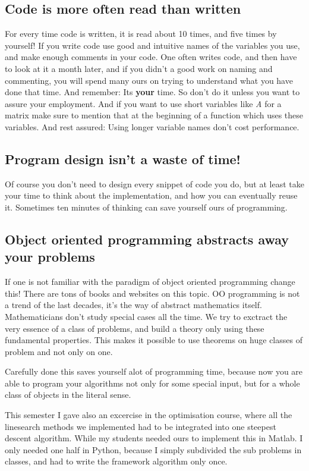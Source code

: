\documentclass[letterpaper,10pt,english]{manual}
\begin{document}
\subsection{Code is more often read than written}

For every time code is written, it is read about 10 times, and
five times by yourself! If you write code use good and intuitive
names of the variables you use, and make enough comments in your code.
One often writes code, and then have to look at it a month later, and if
you didn't a good work on naming and commenting, you will spend many ours
on trying to understand what you have done that time. And remember: Its \textbf{your} time.
So don't do it unless you want to assure your employment.
And if you want to use short variables like \emph{A} for a matrix make sure to mention
that at the beginning of a function which uses these variables.
And rest assured: Using longer variable names don't cost performance.


\subsection{Program design isn't a waste of time!}

Of course you don't need to design every snippet of code you do,
but at least take your time to think about the implementation, and
how you can eventually reuse it. Sometimes ten minutes of thinking
can save yourself ours of programming.


\subsection{Object oriented programming abstracts away your problems}

If one is not familiar with the paradigm of object oriented programming change this!
There are tons of books and websites on this topic.
OO programming is not a trend of the last decades, it's the way of abstract mathematics itself.
Mathematicians don't study special cases all the time. We try to exctract the very essence of a class
of problems, and build a theory only using these fundamental properties. This makes it possible to
use theorems on huge classes of problem and not only on one.

Carefully done this saves yourself alot of programming time, because now you are able
to program your algorithms not only for some special input, but for a whole class of objects
in the literal sense.

This semester I gave also an excercise in the optimisation course, where
all the linesearch methods we implemented had to be integrated into one steepest descent algorithm.
While my students needed ours to implement this in Matlab. I only needed one half in Python, because
I simply subdivided the sub problems in classes, and had to write the framework algorithm only once.
\end{document}
